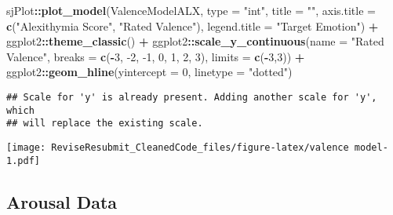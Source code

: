 \documentclass[]{article}
\newenvironment{Shaded}{\begin{snugshade}}{\end{snugshade}}
\newcommand{\DataTypeTok}[1]{\textcolor[rgb]{0.13,0.29,0.53}{#1}}
\newcommand{\DecValTok}[1]{\textcolor[rgb]{0.00,0.00,0.81}{#1}}
\newcommand{\KeywordTok}[1]{\textcolor[rgb]{0.13,0.29,0.53}{\textbf{#1}}}
\newcommand{\NormalTok}[1]{#1}
\newcommand{\OperatorTok}[1]{\textcolor[rgb]{0.81,0.36,0.00}{\textbf{#1}}}
\newcommand{\StringTok}[1]{\textcolor[rgb]{0.31,0.60,0.02}{#1}}
\begin{document}
\begin{Shaded}
\begin{Highlighting}[]
\NormalTok{sjPlot}\OperatorTok{::}\KeywordTok{plot_model}\NormalTok{(ValenceModelALX, }
                   \DataTypeTok{type =} \StringTok{"int"}\NormalTok{,}
                   \DataTypeTok{title =} \StringTok{""}\NormalTok{,}
                   \DataTypeTok{axis.title =} \KeywordTok{c}\NormalTok{(}\StringTok{"Alexithymia Score"}\NormalTok{, }\StringTok{"Rated Valence"}\NormalTok{),}
                   \DataTypeTok{legend.title =} \StringTok{"Target Emotion"}\NormalTok{) }\OperatorTok{+}\StringTok{ }
\StringTok{  }\NormalTok{ggplot2}\OperatorTok{::}\KeywordTok{theme_classic}\NormalTok{() }\OperatorTok{+}
\StringTok{  }\NormalTok{ggplot2}\OperatorTok{::}\KeywordTok{scale_y_continuous}\NormalTok{(}\DataTypeTok{name =} \StringTok{"Rated Valence"}\NormalTok{, }\DataTypeTok{breaks =} \KeywordTok{c}\NormalTok{(}\OperatorTok{-}\DecValTok{3}\NormalTok{, }\DecValTok{-2}\NormalTok{, }\DecValTok{-1}\NormalTok{, }\DecValTok{0}\NormalTok{, }\DecValTok{1}\NormalTok{, }\DecValTok{2}\NormalTok{, }\DecValTok{3}\NormalTok{), }\DataTypeTok{limits =} \KeywordTok{c}\NormalTok{(}\OperatorTok{-}\DecValTok{3}\NormalTok{,}\DecValTok{3}\NormalTok{)) }\OperatorTok{+}
\StringTok{  }\NormalTok{ggplot2}\OperatorTok{::}\KeywordTok{geom_hline}\NormalTok{(}\DataTypeTok{yintercept =} \DecValTok{0}\NormalTok{, }\DataTypeTok{linetype =} \StringTok{"dotted"}\NormalTok{) }
\end{Highlighting}
\end{Shaded}

\begin{verbatim}
## Scale for 'y' is already present. Adding another scale for 'y', which
## will replace the existing scale.
\end{verbatim}

\texttt{[image: ReviseResubmit\_CleanedCode\_files/figure-latex/valence model-1.pdf]}

\hypertarget{arousal-data}{%
\subsection{Arousal Data}\label{arousal-data}}
\end{document}
